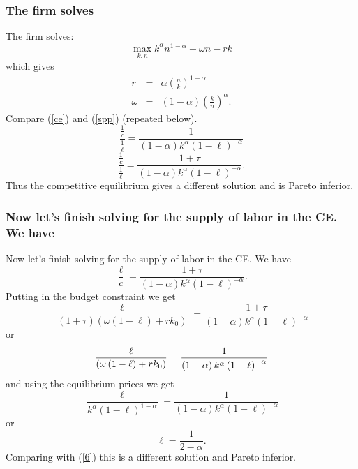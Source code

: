 \documentclass[aspectratio=169]{ltx-talk}
\begin{document}
\begin{frame}
\frametitle{The firm solves}
The firm solves:%
\begin{equation*}
\underset{k,n}{\max }k^{\alpha }n^{1-\alpha }-\omega n-rk
\end{equation*}%
which gives 
\begin{eqnarray*}
r &=&\alpha \left( \frac{n}{k}\right) ^{1-\alpha } \\
\omega &=&\left( 1-\alpha \right) \left( \frac{k}{n}\right) ^{\alpha }.
\end{eqnarray*}%
Compare (\ref{ce}) and (\ref{spp}) (repeated below).%
\begin{equation*}
\frac{\frac{1}{c}}{\frac{1}{\ell }}=\frac{1}{\left( 1-\alpha \right)
k^{\alpha }\left( 1-\ell \right) ^{-\alpha }}
\end{equation*}%
\begin{equation}
\frac{\frac{1}{c}}{\frac{1}{\ell }}=\frac{1+\tau }{\left( 1-\alpha \right)
k^{\alpha }\left( 1-\ell \right) ^{-\alpha }}.  \label{ce}
\end{equation}%
Thus the competitive equilibrium gives a different solution and is Pareto
inferior.
\end{frame}

\begin{frame}
\frametitle{Now let{'}s finish solving for the supply of labor in the CE. We have}
Now let's finish solving for the supply of labor in the CE. We have 
\begin{equation*}
\frac{\ell }{c}=\frac{1+\tau }{\left( 1-\alpha \right) k^{\alpha }\left(
1-\ell \right) ^{-\alpha }}.
\end{equation*}%
Putting in the budget constraint we get%
\begin{equation*}
\frac{\ell }{\left( 1+\tau \right) \left( \omega \left( 1-\ell \right)
+rk_{0}\right) }=\frac{1+\tau }{\left( 1-\alpha \right) k^{\alpha }\left(
1-\ell \right) ^{-\alpha }}
\end{equation*}%
or%
\begin{equation*}
\frac{\ell }{\left( \omega \left( 1-\ell \right) +rk_{0}\right) }=\frac{1}{%
\left( 1-\alpha \right) k^{\alpha }\left( 1-\ell \right) ^{-\alpha }}
\end{equation*}%
and using the equilibrium prices we get%
\begin{equation*}
\frac{\ell }{k^{\alpha }\left( 1-\ell \right) ^{1-\alpha }}=\frac{1}{\left(
1-\alpha \right) k^{\alpha }\left( 1-\ell \right) ^{-\alpha }}
\end{equation*}%
or%
\begin{equation}
\ell =\frac{1}{2-\alpha }.  \label{9}
\end{equation}%
Comparing with (\ref{6}) this is a different solution and Pareto
inferior.
\end{frame}
\end{document}
